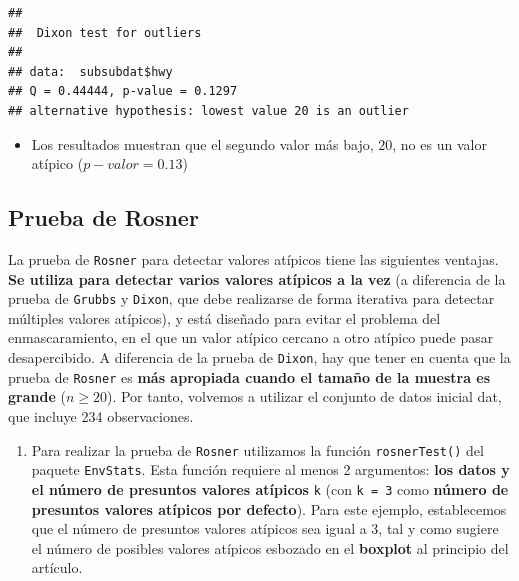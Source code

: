 \documentclass[
]{book}
\newenvironment{Shaded}{\begin{snugshade}}{\end{snugshade}}
\newcommand{\AttributeTok}[1]{\textcolor[rgb]{0.13,0.29,0.53}{#1}}
\newcommand{\DecValTok}[1]{\textcolor[rgb]{0.00,0.00,0.81}{#1}}
\newcommand{\FunctionTok}[1]{\textcolor[rgb]{0.13,0.29,0.53}{\textbf{#1}}}
\newcommand{\NormalTok}[1]{#1}
\newcommand{\OtherTok}[1]{\textcolor[rgb]{0.56,0.35,0.01}{#1}}
\newcommand{\SpecialCharTok}[1]{\textcolor[rgb]{0.81,0.36,0.00}{\textbf{#1}}}
\providecommand{\tightlist}{%
  \setlength{\itemsep}{0pt}\setlength{\parskip}{0pt}}
\begin{document}
\begin{verbatim}
## 
##  Dixon test for outliers
## 
## data:  subsubdat$hwy
## Q = 0.44444, p-value = 0.1297
## alternative hypothesis: lowest value 20 is an outlier
\end{verbatim}

\begin{itemize}
\tightlist
\item
  Los resultados muestran que el segundo valor más bajo, \(20\), no es un valor atípico (\(p-valor = 0.13\))
\end{itemize}

\subsection{Prueba de Rosner}\label{prueba-de-rosner}

La prueba de \texttt{Rosner} para detectar valores atípicos tiene las siguientes ventajas. \textbf{Se utiliza para detectar varios valores atípicos a la vez} (a diferencia de la prueba de \texttt{Grubbs} y \texttt{Dixon}, que debe realizarse de forma iterativa para detectar múltiples valores atípicos), y está diseñado para evitar el problema del enmascaramiento, en el que un valor atípico cercano a otro atípico puede pasar desapercibido. A diferencia de la prueba de \texttt{Dixon}, hay que tener en cuenta que la prueba de \texttt{Rosner} es \textbf{más apropiada cuando el tamaño de la muestra es grande} (\(n\geq 20\)). Por tanto, volvemos a utilizar el conjunto de datos inicial dat, que incluye 234 observaciones.

\begin{enumerate}
\def\labelenumi{\arabic{enumi}.}
\tightlist
\item
  Para realizar la prueba de \texttt{Rosner} utilizamos la función \texttt{rosnerTest()} del paquete \texttt{EnvStats}. Esta función requiere al menos 2 argumentos: \textbf{los datos y el número de presuntos valores atípicos} \texttt{k} (con \texttt{k\ =\ 3} como \textbf{número de presuntos valores atípicos por defecto}). Para este ejemplo, establecemos que el número de presuntos valores atípicos sea igual a 3, tal y como sugiere el número de posibles valores atípicos esbozado en el \textbf{boxplot} al principio del artículo.
\end{enumerate}

\begin{Shaded}
\end{Shaded}
\end{document}
